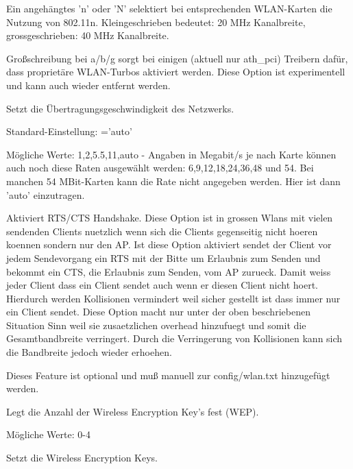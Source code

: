 \begin{description}
        Ein angehängtes 'n' oder 'N' selektiert bei entsprechenden WLAN-Karten die Nutzung von 802.11n.
        Kleingeschrieben bedeutet: 20 MHz Kanalbreite, grossgeschrieben: 40 MHz Kanalbreite.
        
        Großschreibung bei a/b/g sorgt bei einigen (aktuell nur ath\_pci) Treibern dafür, dass proprietäre 
        WLAN-Turbos aktiviert werden. Diese Option ist experimentell und kann auch wieder entfernt werden.


        Setzt die Übertragungsgeschwindigkeit des Netzwerks.

        Standard-Einstellung: ='auto'

        Mögliche Werte: 1,2,5.5,11,auto - Angaben in Megabit/s
        je nach Karte können auch noch diese Raten ausgewählt werden: 6,9,12,18,24,36,48 und 54.
        Bei manchen 54 MBit-Karten kann die Rate nicht angegeben werden. Hier ist dann 'auto' einzutragen.
        

        Aktiviert RTS/CTS Handshake. Diese Option ist in grossen Wlans mit vielen sendenden Clients nuetzlich wenn sich die Clients gegenseitig nicht hoeren koennen sondern nur den AP.
        Ist diese Option aktiviert sendet der Client vor jedem Sendevorgang ein RTS mit der Bitte um Erlaubnis zum Senden und bekommt ein CTS, die Erlaubnis zum Senden, vom AP zurueck. Damit weiss jeder Client dass ein Client sendet auch wenn er diesen Client nicht hoert.
        Hierdurch werden Kollisionen vermindert weil sicher gestellt ist dass immer nur ein Client sendet. Diese Option macht nur unter der oben beschriebenen Situation Sinn weil sie zusaetzlichen overhead hinzufuegt und somit die Gesamtbandbreite verringert. Durch die Verringerung von Kollisionen kann sich die Bandbreite jedoch wieder erhoehen.

        Dieses Feature ist optional und muß manuell zur config/wlan.txt hinzugefügt werden.
        

        Legt die Anzahl der Wireless Encryption Key's fest (WEP).

        Mögliche Werte: 0-4


        Setzt die Wireless Encryption Keys.


\end{description}

